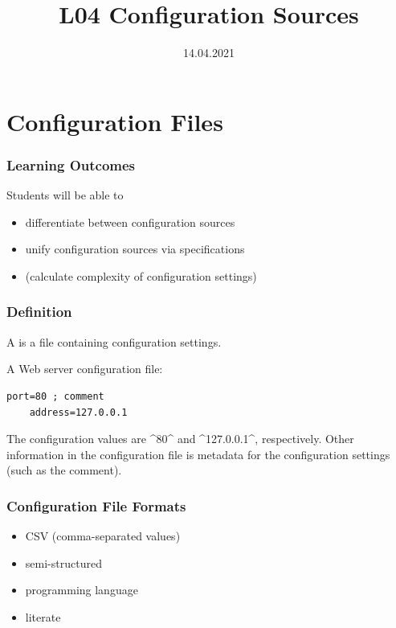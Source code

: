

\title{L04 Configuration Sources}
\date{14.04.2021}



\section{Configuration Files}

\begin{frame}
	\frametitle{Learning Outcomes}
	Students will be able to
	\begin{itemize}
	\item differentiate between configuration sources
	\item unify configuration sources via specifications
	\item (calculate complexity of configuration settings)
	\end{itemize}
\end{frame}

\begin{frame}[fragile]
	\frametitle{Definition}
	A  is a file containing configuration settings.

	\pause
	A Web server configuration file:

	\begin{lstlisting}[gobble=4]
	port=80 ; comment
	address=127.0.0.1\end{lstlisting}

	\pause

	The configuration values are ^80^ and ^127.0.0.1^, respectively.
	Other information in the configuration file is metadata for the configuration settings (such as the comment).
\end{frame}

\begin{frame}
	\frametitle{Configuration File Formats}
	\begin{itemize}
	\item CSV (comma-separated values)
	\item semi-structured
	\item programming language
	\item literate
	\end{itemize}
\end{frame}

